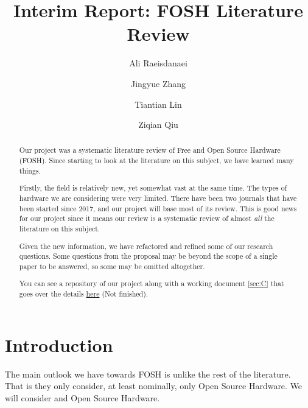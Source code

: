 \documentclass[acmtog]{acmart}
\begin{document}
\title{Interim Report: FOSH Literature Review}

\author{Ali Raeisdanaei}

\author{Jingyue Zhang}

\author{Tiantian Lin}

\author{Ziqian Qiu}

\begin{abstract}
Our project was a systematic literature review of Free and Open Source Hardware (FOSH).
Since starting to look at the literature on this subject, we have learned many things. 

Firstly, the field is relatively new, yet somewhat vast at the same time. 
The types of hardware we are considering were very limited.
There have been two journals that have been started since 2017, and our project will base most of its review. 
This is good news for our project since it means our review is a systematic review of almost \textit{all} the literature on this subject. 

Given the new information, we have refactored and refined some of our research questions. 
Some questions from the proposal may be beyond the scope of a single paper to be answered, so some may be omitted altogether. 

You can see a repository of our project along with a working document \ref{sec:C} that goes over the details
\href{https://github.com/aliraeisdanaei/FOSH_Lit_Review/}{here}
(Not finished).
\end{abstract}



\maketitle

\section{Introduction}
The main outlook we have towards FOSH is unlike the rest of the literature. 
That is they only consider, at least nominally, only Open Source Hardware. 
We will consider  and Open Source Hardware. 
\end{document}
